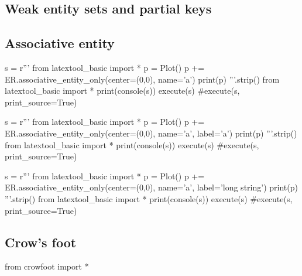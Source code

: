\newpage
\subsection{Weak entity sets and partial keys}



\newpage
\subsection{Associative entity}
\begin{python}
s = r'''
from latextool_basic import *
p = Plot()
p += ER.associative_entity_only(center=(0,0), name='a')
print(p)
'''.strip()
from latextool_basic import *
print(console(s))
execute(s)
#execute(s, print_source=True)
\end{python}

\begin{python}
s = r'''
from latextool_basic import *
p = Plot()
p += ER.associative_entity_only(center=(0,0), name='a', label='a')
print(p)
'''.strip()
from latextool_basic import *
print(console(s))
execute(s)
#execute(s, print_source=True)
\end{python}

\begin{python}
s = r'''
from latextool_basic import *
p = Plot()
p += ER.associative_entity_only(center=(0,0), name='a', label='long string')
print(p)
'''.strip()
from latextool_basic import *
print(console(s))
execute(s)
#execute(s, print_source=True)
\end{python}



\newpage
\subsection{Crow's foot}


\begin{python}
from crowfoot import *
\end{python}
